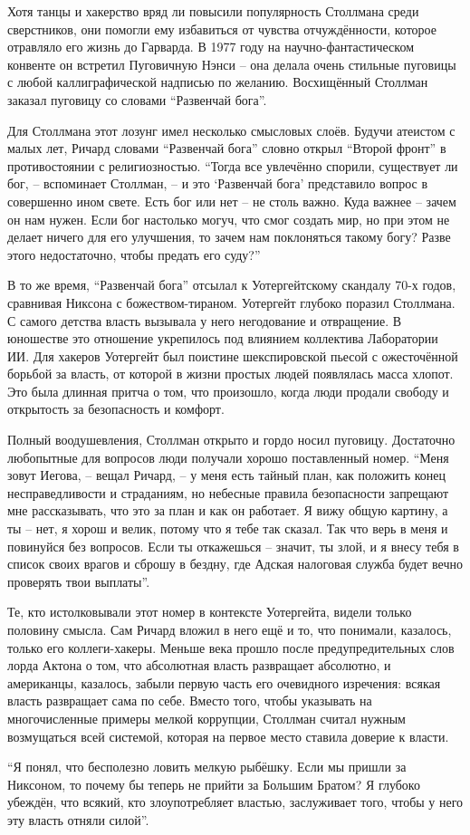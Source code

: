 Хотя танцы и хакерство вряд ли повысили популярность Столлмана среди сверстников, они помогли ему избавиться от чувства отчуждённости, которое отравляло его жизнь до Гарварда. В 1977 году на научно-фантастическом конвенте он встретил Пуговичную Нэнси -- она делала очень стильные пуговицы с любой каллиграфической надписью по желанию. Восхищённый Столлман заказал пуговицу со словами \enquote{Развенчай бога}.

Для Столлмана этот лозунг имел несколько смысловых слоёв. Будучи атеистом с малых лет, Ричард словами \enquote{Развенчай бога} словно открыл \enquote{Второй фронт} в противостоянии с религиозностью. \enquote{Тогда все увлечённо спорили, существует ли бог, -- вспоминает Столлман, -- и это \enquote{Развенчай бога} представило вопрос в совершенно ином свете. Есть бог или нет -- не столь важно. Куда важнее -- зачем он нам нужен. Если бог настолько могуч, что смог создать мир, но при этом не делает ничего для его улучшения, то зачем нам поклоняться такому богу? Разве этого недостаточно, чтобы предать его суду?}

В то же время, \enquote{Развенчай бога} отсылал к Уотергейтскому скандалу 70-х годов, сравнивая Никсона с божеством-тираном. Уотергейт глубоко поразил Столлмана. С самого детства власть вызывала у него негодование и отвращение. В юношестве это отношение укрепилось под влиянием коллектива Лаборатории ИИ. Для хакеров Уотергейт был поистине шекспировской пьесой с ожесточённой борьбой за власть, от которой в жизни простых людей появлялась масса хлопот. Это была длинная притча о том, что произошло, когда люди продали свободу и открытость за безопасность и комфорт.

Полный воодушевления, Столлман открыто и гордо носил пуговицу. Достаточно любопытные для вопросов люди получали хорошо поставленный номер. \enquote{Меня зовут Иегова, -- вещал Ричард, -- у меня есть тайный план, как положить конец несправедливости и страданиям, но небесные правила безопасности запрещают мне рассказывать, что это за план и как он работает. Я вижу общую картину, а ты -- нет, я хорош и велик, потому что я тебе так сказал. Так что верь в меня и повинуйся без вопросов. Если ты откажешься -- значит, ты злой, и я внесу тебя в список своих врагов и сброшу в бездну, где Адская налоговая служба будет вечно проверять твои выплаты}.

Те, кто истолковывали этот номер в контексте Уотергейта, видели только половину смысла. Сам Ричард вложил в него ещё и то, что понимали, казалось, только его коллеги-хакеры. Меньше века прошло после предупредительных слов лорда Актона о том, что абсолютная власть развращает абсолютно, и американцы, казалось, забыли первую часть его очевидного изречения: всякая власть развращает сама по себе. Вместо того, чтобы указывать на многочисленные примеры мелкой коррупции, Столлман считал нужным возмущаться всей системой, которая на первое место ставила доверие к власти.

\enquote{Я понял, что бесполезно ловить мелкую рыбёшку. Если мы пришли за Никсоном, то почему бы теперь не прийти за Большим Братом? Я глубоко убеждён, что всякий, кто злоупотребляет властью, заслуживает того, чтобы у него эту власть отняли силой}.

\theendnotes
\setcounter{endnote}{0}
